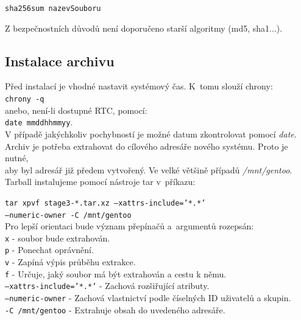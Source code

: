\documentclass[12pt,a4paper,twoside,]{article}
\begin{document}
{{{{{{{\texttt{sha256sum nazevSouboru}

\hspace{-1.5em}Z bezpečnostních důvodů není doporučeno starší algoritmy (md5, sha1...).

\newpage
\subsection{\textsf{Instalace archivu}}
Před instalací je vhodné nastavit systémový čas. K~tomu slouží chrony:\\
\hspace*{1.5em}\texttt{chrony -q}\\
 anebo, není-li dostupné RTC, pomocí: \\ \hspace*{1.5em}\texttt{date mmddhhmmyy}.\\
 
V případě jakýchkoliv pochybností je možné datum zkontrolovat pomocí \textit{date}.
\\Archiv je potřeba extrahovat do cílového adresáře nového systému. Proto je nutné,\\
aby byl adresář již předem vytvořený. Ve velké většině případů \textit{/mnt/gentoo}.\\
Tarball instalujeme pomocí nástroje tar v~příkazu:

\texttt{tar xpvf stage3-*.tar.xz --xattrs-include='*.*' \\\hspace*{1.5em}--numeric-owner -C /mnt/gentoo}\\

\hspace{-1.5em}Pro lepší orientaci bude význam přepínačů a~argumentů rozepsán:\\

\texttt{x} - soubor bude extrahován.\\
\hspace*{1.5em}\texttt{p} - Ponechat oprávnění. \\
\hspace*{1.5em}\texttt{v} - Zapíná výpis průběhu extrakce.\\
\hspace*{1.5em}\texttt{f} - Určuje, jaký soubor má být extrahován a cestu k němu.\\
\hspace*{1.5em}\texttt{--xattrs-include='*.*'} - Zachová rozšiřující atributy.\\
\hspace*{1.5em}\texttt{--numeric-owner} - Zachová vlastnictví podle číselných ID uživatelů a
skupin.\\
\hspace*{1.5em}\texttt{-C /mnt/gentoo} - Extrahuje obsah do uvedeného adresáře.\\



}}}}}}}
\end{document}
